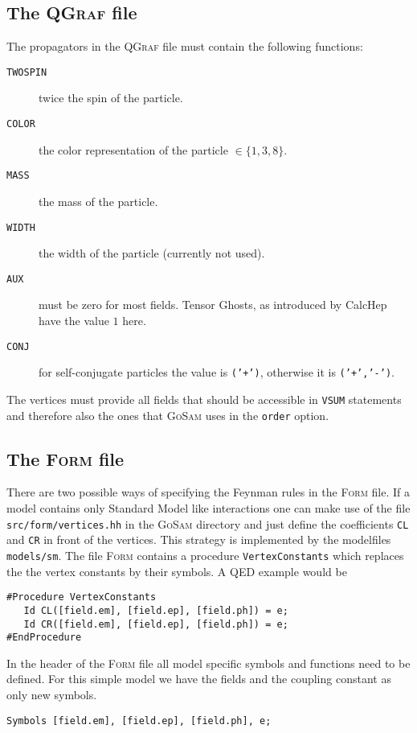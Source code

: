 \documentclass[11pt,a4paper]{refrep}
\newcommand{\gosamversion}{{3{.}0}}
\newcommand{\gosamv}[1][\gosamversion]{\textsc{GoSam}\xspace}
\newcommand{\qgraf}{\textsc{QGraf}\xspace}
\newcommand{\form}{\textsc{Form}\xspace}
\begin{document}
\subsection{The \qgraf{} file}
The propagators in the \qgraf{} file must contain the following functions:
\begin{description}
\item[\texttt{TWOSPIN}] twice the spin of the particle.
\item[\texttt{COLOR}]   the color representation of the particle $\in\{1,3,8\}$.
\item[\texttt{MASS}]    the mass of the particle.
\item[\texttt{WIDTH}]   the width of the particle (currently not used).
\item[\texttt{AUX}]     must be zero for most fields. Tensor Ghosts, as introduced
                        by CalcHep have the value $1$ here.
\item[\texttt{CONJ}]    for self-conjugate particles the value is \texttt{('+')},
                        otherwise it is \texttt{('+','-')}.
\end{description}

The vertices must provide all fields that should be accessible in \texttt{VSUM} statements
and therefore also the ones that \gosamv{} uses in the \texttt{order} option.

\subsection{The \form{} file}
There are two possible ways of specifying the Feynman rules in the \form{} file.
If a model contains only Standard Model like interactions one can make use of
the file \texttt{src/form/vertices.hh} in the \gosamv{} directory and just define
the coefficients \texttt{CL} and \texttt{CR} in front of the vertices. This
strategy is implemented by the modelfiles \texttt{models/sm}. The file
\form{} contains a procedure \texttt{VertexConstants} which
replaces the the vertex constants by their symbols. A QED example would be
\begin{lstlisting}[style=form]
#Procedure VertexConstants
   Id CL([field.em], [field.ep], [field.ph]) = e;
   Id CR([field.em], [field.ep], [field.ph]) = e;
#EndProcedure
\end{lstlisting}
In the header of the \form{} file all model specific
symbols and functions need to be defined. For this simple
model we have the fields and the coupling constant as only
new symbols.
\begin{lstlisting}[style=form]
Symbols [field.em], [field.ep], [field.ph], e;
\end{lstlisting}
\end{document}
